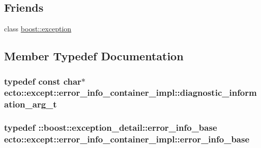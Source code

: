 \subsection*{\-Friends}
\begin{DoxyCompactItemize}
\item 
class \hyperlink{classecto_1_1except_1_1error__info__container__impl_a17667d5fc9c440eb33937b735d4fdfe6}{boost\-::exception}
\end{DoxyCompactItemize}


\subsection{\-Member \-Typedef \-Documentation}
\hypertarget{classecto_1_1except_1_1error__info__container__impl_a16f5ebd1abcacd60ddbd919ea166958e}{
\subsubsection[{diagnostic\-\_\-information\-\_\-arg\-\_\-t}]{\setlength{\rightskip}{0pt plus 5cm}typedef const char$\ast$ {\bf ecto\-::except\-::error\-\_\-info\-\_\-container\-\_\-impl\-::diagnostic\-\_\-information\-\_\-arg\-\_\-t}}}\label{classecto_1_1except_1_1error__info__container__impl_a16f5ebd1abcacd60ddbd919ea166958e}
\hypertarget{classecto_1_1except_1_1error__info__container__impl_a90c2628bf7c5628003cd24fd369a77da}{
\subsubsection[{error\-\_\-info\-\_\-base}]{\setlength{\rightskip}{0pt plus 5cm}typedef \-::boost\-::exception\-\_\-detail\-::error\-\_\-info\-\_\-base {\bf ecto\-::except\-::error\-\_\-info\-\_\-container\-\_\-impl\-::error\-\_\-info\-\_\-base}}}\label{classecto_1_1except_1_1error__info__container__impl_a90c2628bf7c5628003cd24fd369a77da}
